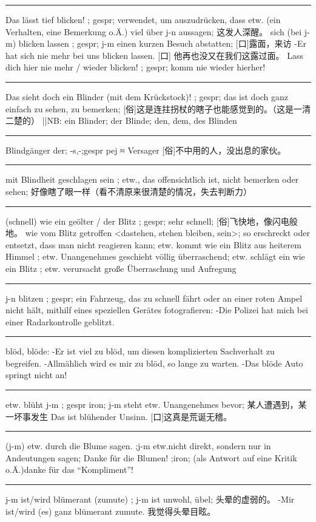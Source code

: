 \noindent\rule{\textwidth}{1pt} 
Das lässt tief blicken! ; gespr; verwendet, um auszudrücken, dass etw. (ein Verhalten, eine Bemerkung o.Ä.) viel über j-n aussagen; 这发人深醒。
sich (bei j-m) blicken lassen ; gespr; j-m einen kurzen Besuch abstatten; [口]露面，来访
-Er hat sich nie mehr bei uns blicken lassen. [口] 他再也没又在我们这露过面。
Lass dich hier nie mehr / wieder blicken! ; gespr; komm nie wieder hierher!

\noindent\rule{\textwidth}{1pt} 
Das sieht doch ein Blinder (mit dem Krückstock)! ; gespr; das ist doch ganz einfach zu sehen, zu bemerken; [俗]这是连拄拐杖的瞎子也能感觉到的。（这是一清二楚的）
||NB: ein Blinder; der Blinde; den, dem, des Blinden

\noindent\rule{\textwidth}{1pt} 
Blindgänger der; -s,-;gespr pej ≈ Versager [俗]不中用的人，没出息的家伙。

\noindent\rule{\textwidth}{1pt} 
mit Blindheit geschlagen sein ; etw., das offensichtlich ist, nicht bemerken oder sehen; 好像瞎了眼一样（看不清原来很清楚的情况，失去判断力）
\noindent\rule{\textwidth}{1pt} 
(schnell) wie ein geölter / der Blitz ; gespr; sehr schnell; [俗]飞快地，像闪电般地。
wie vom Blitz getroffen \textless dastehen, stehen bleiben, sein\textgreater  ; so erschreckt oder entsetzt, dass man nicht reagieren kann;
etw. kommt wie ein Blitz aus heiterem Himmel ; etw. Unangenehmes geschieht völlig überraschend;
etw. schlägt ein wie ein Blitz ; etw. verursacht große Überraschung und Aufregung

\noindent\rule{\textwidth}{1pt} 
j-n blitzen ; gespr; ein Fahrzeug, das zu schnell fährt oder an einer roten Ampel nicht hält, mithilf eines speziellen Gerätes fotografieren:
-Die Polizei hat mich bei einer Radarkontrolle geblitzt.

\noindent\rule{\textwidth}{1pt} 
blöd, blöde:
-Er ist viel zu blöd, um diesen komplizierten Sachverhalt zu begreifen.
-Allmählich wird es mir zu blöd, so lange zu warten.
-Das blöde Auto springt nicht an!

\noindent\rule{\textwidth}{1pt} 
etw. blüht j-m ; gespr iron; j-m steht etw. Unangenehmes bevor; 某人遭遇到，某一坏事发生
Das ist blühender Unsinn. [口]这真是荒诞无稽。

\noindent\rule{\textwidth}{1pt} 
(j-m) etw. durch die Blume sagen. ;j-m etw.nicht direkt, sondern nur in Andeutungen sagen;
Danke für die Blumen! ;iron; (als Antwort auf eine Kritik o.Ä.)danke für das ``Kompliment''!

\noindent\rule{\textwidth}{1pt} 
j-m ist/wird blümerant (zumute) ; j-m ist unwohl, übel; 头晕的虚弱的。
-Mir ist/wird (es) ganz blümerant zumute. 我觉得头晕目眩。

